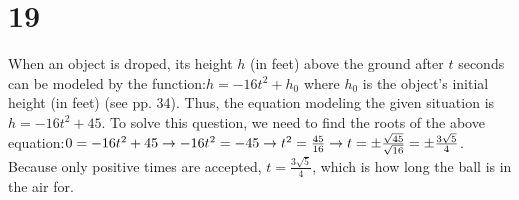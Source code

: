 \documentclass{article}
\theoremstyle{definition}
\begin{document}
\section*{19}
When an object is droped, its height $h$ (in feet) above the ground after $t$ seconds can be modeled by the function:\newline $h=-16t^2+h_0$\newline 
where $h_0$ is the object's initial height (in feet) (see pp. 34). Thus, the equation modeling the given situation is $h=-16t^2+45$. To solve this question, 
we need to find the roots of the above equation:\newline $0=-16t^2+45\newline\rightarrow -16t^2=-45\newline\rightarrow t^2=\frac{45}{16}\newline\rightarrow 
t=\pm\frac{\sqrt{45}}{\sqrt{16}}=\pm\frac{3\sqrt{5}}{4}$. Because only positive times are accepted, $t=\frac{3\sqrt{5}}{4}$, which is how long the ball 
is in the air for.
\end{document}
